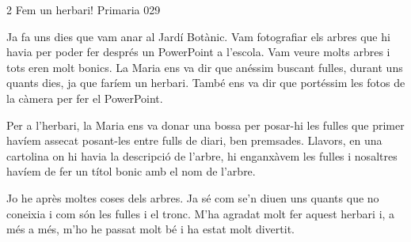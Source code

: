 \begin{news}
{2} %
{Fem un herbari!}
{}
{Primaria}
{029} %


Ja fa uns dies que vam anar al Jardí Botànic. Vam fotografiar els arbres que hi havia per poder fer després un PowerPoint a l’escola. Vam veure molts arbres i tots eren molt bonics. 
La Maria ens va dir que anéssim buscant fulles, durant uns quants dies, ja que faríem un herbari. També ens va dir que portéssim les fotos de la càmera per fer el PowerPoint. 

Per a l’herbari, la Maria ens va donar una bossa per posar-hi les fulles que primer havíem assecat posant-les entre fulls de diari, ben premsades. Llavors, en una cartolina on hi havia la descripció de l’arbre, hi enganxàvem les fulles i nosaltres havíem de fer un títol bonic amb el nom de l’arbre.

Jo he après moltes coses dels arbres. Ja sé com se’n diuen uns quants que no coneixia i com són les fulles i el tronc. M’ha agradat molt fer aquest herbari i, a més a més, m’ho he passat molt bé i ha estat molt divertit.


\end{news}
